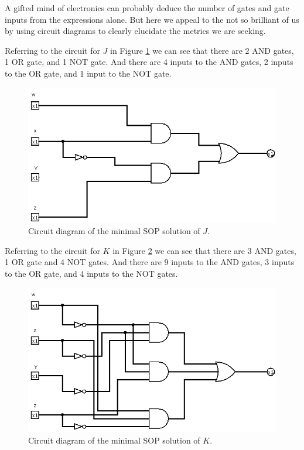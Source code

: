 \documentclass[12pt]{article}
\begin{document}
A gifted mind of electronics can probably deduce the number of
gates and gate inputs from the expressions alone.
But here we appeal to the not so brilliant of us by using
circuit diagrams to clearly elucidate the metrics we
are seeking.

\samepage
Referring to the circuit for $J$ in Figure \ref{fig:Jminsop-01} we
can see that there are 2 AND gates, 1 OR gate, and 1 NOT gate.
And there are 4 inputs to the AND gates, 2 inputs to the OR gate,
and 1 input to the NOT gate.

\begin{figure}[tbp]
\center
\includegraphics[scale=0.5]{Jminsop-01}
\caption{Circuit diagram of the minimal SOP solution of $J$.}
\label{fig:Jminsop-01}
\end{figure}

Referring to the circuit for $K$ in Figure \ref{fig:Kminsop-01} we
can see that there are 3 AND gates, 1 OR gate and 4 NOT gates.
And there are 9 inputs to the AND gates, 3 inputs to the OR gate,
and 4 inputs to the NOT gates.

\begin{figure}[tbp]
\center
\includegraphics[scale=0.5]{Kminsop-01}
\caption{Circuit diagram of the minimal SOP solution of $K$.}
\label{fig:Kminsop-01}
\end{figure}
\end{document}
